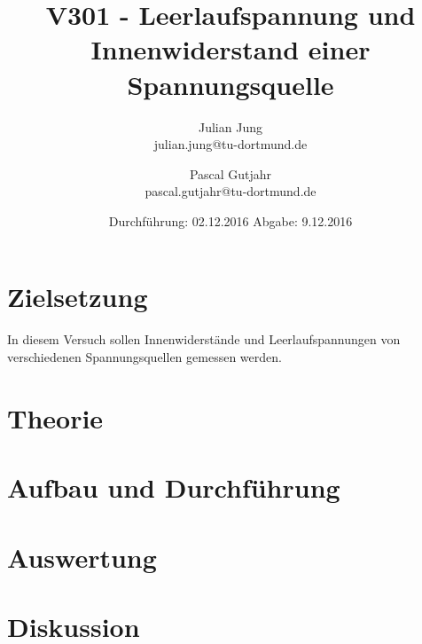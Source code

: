 

\title{V301 - Leerlaufspannung und Innenwiderstand einer Spannungsquelle}
\author{Julian Jung \\ julian.jung@tu-dortmund.de
  \and Pascal Gutjahr \\ pascal.gutjahr@tu-dortmund.de}
  \date{Durchführung: 02.12.2016
  \hspace{3em}
  Abgabe: 9.12.2016}
  
\maketitle
\newpage
\tableofcontents
\newpage
\section{Zielsetzung}
In diesem Versuch sollen Innenwiderstände und Leerlaufspannungen von verschiedenen
Spannungsquellen gemessen werden.
\section{Theorie}
 
\section{Aufbau und Durchführung}
 
\section{Auswertung}
% 
\section{Diskussion}
% 
\printbibliography


